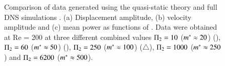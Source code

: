 \begin{figure}
{\begin{picture}
      



%      
%  

      
    \end{picture}
}
  \caption{Comparison of data generated using the quasi-static theory and full DNS simulations . (a) Displacement amplitude, (b) velocity amplitude and (c) mean power as functions of \massdamp. Data were obtained at Re = 200 at three different combined  values $\massdamp=10$ ($\mstar \approx 20$) (), $\massdamp=60$ ($\mstar \approx 50$) (), $\massdamp=250$ ($\mstar \approx 100$) ($\triangle$), $\massdamp=1000$ ($\mstar \approx 250$) and $\massdamp=6200$ ($\mstar \approx 500$).}
    \label{fig:qss_fsi}
\end{figure}

